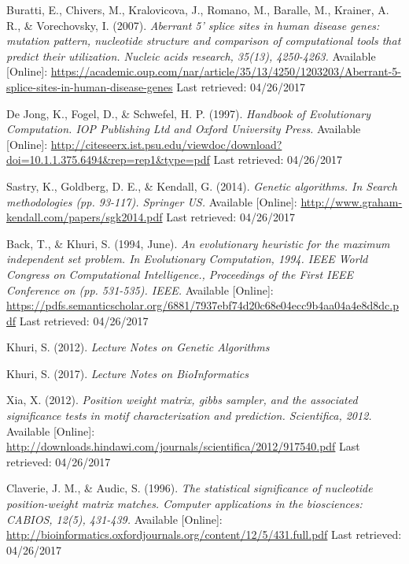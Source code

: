 \documentclass[12pt,a4paper]{article}
\begin{document}
\begin{thebibliography}{9}
		Buratti, E., Chivers, M., Kralovicova, J., Romano, M., Baralle, M., Krainer, A. R., \& Vorechovsky, I. (2007). 
		\textit{Aberrant 5' splice sites in human disease genes: mutation pattern, nucleotide structure and comparison of computational tools that predict their utilization. Nucleic acids research, 35(13), 4250-4263.}
		Available [Online]: \url{https://academic.oup.com/nar/article/35/13/4250/1203203/Aberrant-5-splice-sites-in-human-disease-genes}
		Last retrieved: 04/26/2017

		De Jong, K., Fogel, D., \& Schwefel, H. P. (1997). 
		\textit{Handbook of Evolutionary Computation. IOP Publishing Ltd and Oxford University Press.}
		Available [Online]: \url{http://citeseerx.ist.psu.edu/viewdoc/download?doi=10.1.1.375.6494&rep=rep1&type=pdf}
		Last retrieved: 04/26/2017

		Sastry, K., Goldberg, D. E., \& Kendall, G. (2014).
		\textit{ Genetic algorithms. In Search methodologies (pp. 93-117). Springer US.}
		Available [Online]: \url{http://www.graham-kendall.com/papers/sgk2014.pdf}
		Last retrieved: 04/26/2017
		
		Back, T., \& Khuri, S. (1994, June). 
		\textit{ An evolutionary heuristic for the maximum independent set problem. In Evolutionary Computation, 1994. IEEE World Congress on Computational Intelligence., Proceedings of the First IEEE Conference on (pp. 531-535). IEEE.}
		Available [Online]: \url{https://pdfs.semanticscholar.org/6881/7937ebf74d20c68e04ecc9b4aa04a4e8d8dc.pdf}
		Last retrieved: 04/26/2017

		Khuri, S. (2012). 
		\textit{ Lecture Notes on Genetic Algorithms }

		Khuri, S. (2017). 
		\textit{ Lecture Notes on BioInformatics }	    

		Xia, X. (2012).
		\textit{ Position weight matrix, gibbs sampler, and the associated significance tests in motif characterization and prediction. Scientifica, 2012.}
		Available [Online]: \url{http://downloads.hindawi.com/journals/scientifica/2012/917540.pdf} Last retrieved: 04/26/2017
		
		Claverie, J. M., \& Audic, S. (1996).
		\textit{The statistical significance of nucleotide position-weight matrix matches. Computer applications in the biosciences: CABIOS, 12(5), 431-439.}
		Available [Online]: \url{http://bioinformatics.oxfordjournals.org/content/12/5/431.full.pdf} Last retrieved: 04/26/2017
	    

\end{thebibliography}
\end{document}
